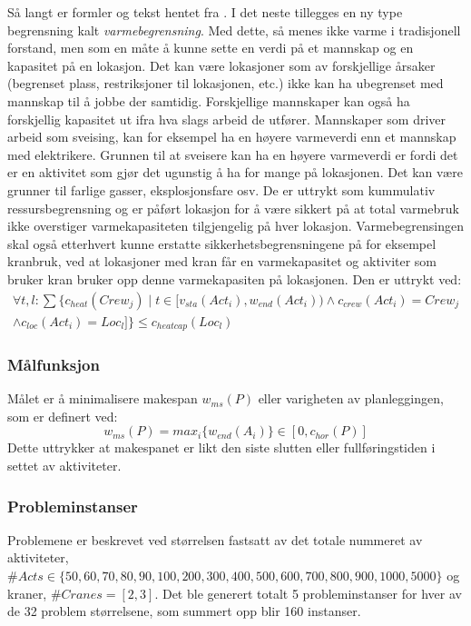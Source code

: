 Så langt er formler og tekst hentet fra \cite{tvedtbezem}. I det neste tillegges en ny type begrensning kalt \textit{varmebegrensning}. Med dette, så menes ikke varme i tradisjonell forstand, men som en måte å kunne sette en verdi på et mannskap og en kapasitet på en lokasjon. Det kan være lokasjoner som av forskjellige årsaker (begrenset plass, restriksjoner til lokasjonen, etc.) ikke kan ha ubegrenset med mannskap til å jobbe der samtidig. Forskjellige mannskaper kan også ha forskjellig kapasitet ut ifra hva slags arbeid de utfører. Mannskaper som driver arbeid som sveising, kan for eksempel ha en høyere varmeverdi enn et mannskap med elektrikere. Grunnen til at sveisere kan ha en høyere varmeverdi er fordi det er en aktivitet som gjør det ugunstig å ha for mange på lokasjonen. Det kan være grunner til farlige gasser, eksplosjonsfare osv. De er uttrykt som kummulativ ressursbegrensning og er påført lokasjon for å være sikkert på at total varmebruk ikke overstiger varmekapasiteten tilgjengelig på hver lokasjon. Varmebegrensingen skal også etterhvert kunne erstatte sikkerhetsbegrensningene på for eksempel kranbruk, ved at lokasjoner med kran får en varmekapasitet og aktiviter som bruker kran bruker opp denne varmekapasiten på lokasjonen. Den er uttrykt ved:
\begin{equation}
\begin{split}
\forall t,l: \sum\{c_{heat}(Crew_j) \mid t \in [ v_{sta}(Act_{i}), w_{end}(Act_{i})) \wedge c_{crew}(Act_{i}) = Crew_{j} \\
\wedge c_{loc}(Act_{i}) = Loc_{l} ] \} \le c_{heatcap}(Loc_{l})
\end{split}
\end{equation}

\subsubsection{Målfunksjon}
Målet er å minimalisere makespan $ w_{ms}(P) $ eller varigheten av planleggingen, som er definert ved:
\begin{equation}
w_{ms}(P) = max_{i} \{ w_{end}(A_{i}) \} \in [0,c_{hor}(P)]
\end{equation}
Dette uttrykker at makespanet er likt den siste slutten eller fullføringstiden i settet av aktiviteter.

\subsubsection{Probleminstanser}
Problemene er beskrevet ved størrelsen fastsatt av det totale nummeret av aktiviteter, $ \#Acts \in \{ 50,60, 70, 80, 90, 100, 200, 300, 400, 500, 600, 700, 800, 900, 1000, 5000 \} $ og kraner, $ \#Cranes = [2,3] $. Det ble generert totalt 5 probleminstanser for hver av de 32 problem størrelsene, som summert opp blir 160 instanser.

